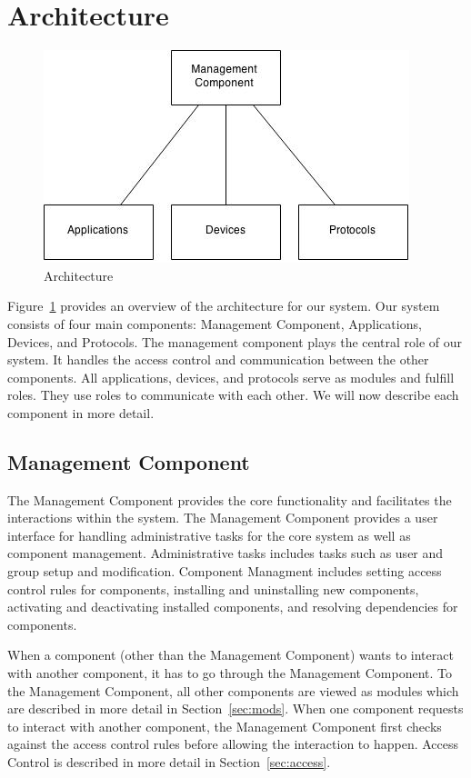 \section{Architecture}
\label{sec:arch}
\begin{figure}[tbh]
    \centering
    \includegraphics[width=1.0\columnwidth]{figs/homeOSArch.jpg}
    \caption{Architecture}
    \label{Fig:Arch}
\end{figure}
Figure~\ref{Fig:Arch} provides an overview of the architecture for our system.
Our system consists of four main components: Management Component, Applications,
Devices, and Protocols. The management component plays the central role of our
system. It handles the access control and communication between the other
components. All applications, devices, and protocols serve as modules and
fulfill roles. They use roles to communicate with each other. We will now
describe each component in more detail.
\subsection{Management Component}
\label{sec:mgmt}
The Management Component provides the core functionality and facilitates the
interactions within the system. The Management Component provides a user
interface for handling administrative tasks for the core system as well as
component management. Administrative tasks includes tasks such as user and
group setup and modification. Component Managment includes setting access
control rules for components, installing and uninstalling new components,
activating and deactivating installed components, and resolving dependencies
for components. 

When a component (other than the Management Component) wants to interact with
another component, it has to go through the Management Component. To the
Management Component, all other components are viewed as modules which are
described in more detail in Section~\ref{sec:mods}. When one component requests
to interact with another component, the Management Component first checks
against the access control rules before allowing the interaction to happen.
Access Control is described in more detail in Section~\ref{sec:access}.
